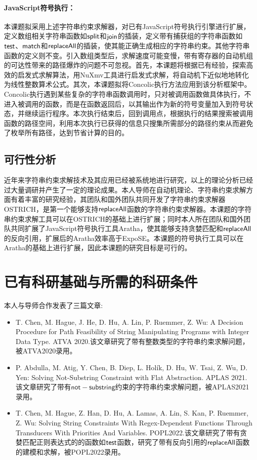 \paragraph{JavaScript符号执行：} 本课题拟采用上述字符串约束求解器，对已有JavaScript符号执行引擎进行扩展，定义数组相关字符串函数如$\mathsf{split}$和$\mathsf{join}$的插装，定义带有捕获组的字符串函数如$\mathsf{test}$、$\mathsf{match}$和$\mathsf{replaceAll}$的插装，使其能正确生成相应的字符串约束。其他字符串函数的定义则不变。引入数组类型后，求解速度可能变慢，带有寄存器的自动机组的可达性带来的路径爆炸的问题不可忽视。首先，本课题将根据已有经验，探索高效的启发式求解算法，用NuXmv工具进行启发式求解，将自动机下近似地地转化为线性整数算术公式。其次，本课题拟将Concolic执行方法应用到该分析框架中。Concolic执行遇到某些复杂的字符串函数调用时，只对被调用函数做具体执行，不进入被调用的函数，而是在函数返回后，以其输出作为新的符号变量加入到符号状态，并继续运行程序。本次执行结束后，回到调用点，根据执行的结果搜索被调用函数的路径空间，利用本次执行已获得的信息只搜集所需部分的路径约束从而避免了枚举所有路径，达到节省计算的目的。

\subsection{可行性分析}
近年来字符串约束求解技术及其应用已经被系统地进行研究，以上的理论分析已经过大量调研并产生了一定的理论成果。本人导师在自动机理论、字符串约束求解方面有着丰富的研究经验，其团队和国外团队共同开发了字符串约束求解器OSTRICH，是第一个能够支持$\mathsf{replaceAll}$函数的字符串约束求解器。本课题的字符串约束求解工具可以在OSTRICH的基础上进行扩展；同时本人所在团队和国外团队共同扩展了JavaScript符号执行工具Aratha，使其能够支持贪婪匹配和$\mathsf{replaceAll}$的反向引用，扩展后的Aratha效率高于ExpoSE。本课题的符号执行工具可以在Aratha的基础上进行扩展，因此本课题的研究目标是可行的。

\section{已有科研基础与所需的科研条件}
本人与导师合作发表了三篇文章:
\begin{itemize}
    \item  T. Chen, M. Hague, J. He, D. Hu, A. Lin, P. Ruemmer, Z. Wu: A Decision Procedure for Path Feasibility of String Manipulating Programs with Integer Data Type. ATVA 2020.\cite{ostrich_atva}该文章研究了带有整数类型的字符串约束求解问题，被ATVA2020录用。
    \item P. Abdulla, M. Atig, Y. Chen, B. Diep, L. Holík, D. Hu, W. Tsai, Z. Wu, D. Yen: Solving Not-Substring Constraint with Flat Abstraction. APLAS 2021.\cite{not_substr}该文章研究了带有$\mathsf{not-substring}$约束的字符串约束求解问题，被APLAS2021录用。
    \item  T. Chen, M. Hague, Z. Han, D. Hu, A. Lamas, A. Lin, S. Kan, P. Ruemmer, Z. Wu: Solving String Constraints With Regex-Dependent Functions Through Transducers With Priorities And Variables. POPL2022.\cite{ostrich_greedy}该文章研究了带有贪婪匹配正则表达式的的函数如$\mathsf{test}$函数，研究了带有反向引用的$\mathsf{replaceAll}$函数的建模和求解，被POPL2022录用。
\end{itemize}

